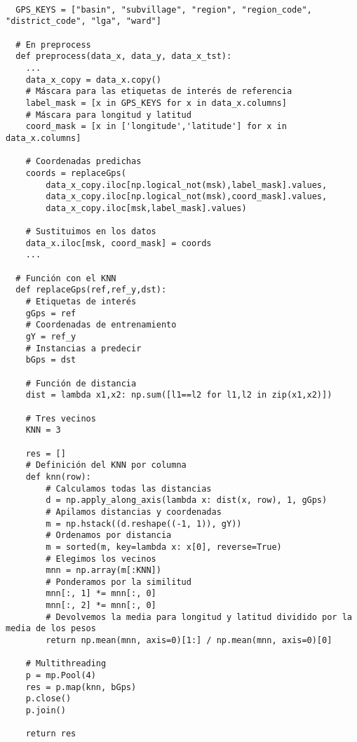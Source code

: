 \documentclass{article}
\begin{document}
\begin{verbatim}
               
  GPS_KEYS = ["basin", "subvillage", "region", "region_code", "district_code", "lga", "ward"]
  
  # En preprocess  
  def preprocess(data_x, data_y, data_x_tst):
    ...
    data_x_copy = data_x.copy()
    # Máscara para las etiquetas de interés de referencia
    label_mask = [x in GPS_KEYS for x in data_x.columns]
    # Máscara para longitud y latitud
    coord_mask = [x in ['longitude','latitude'] for x in data_x.columns]
    
    # Coordenadas predichas
    coords = replaceGps(
        data_x_copy.iloc[np.logical_not(msk),label_mask].values,
        data_x_copy.iloc[np.logical_not(msk),coord_mask].values,
        data_x_copy.iloc[msk,label_mask].values)
    
    # Sustituimos en los datos
    data_x.iloc[msk, coord_mask] = coords
    ...
  
  # Función con el KNN
  def replaceGps(ref,ref_y,dst):
    # Etiquetas de interés
    gGps = ref
    # Coordenadas de entrenamiento
    gY = ref_y
    # Instancias a predecir
    bGps = dst
    
    # Función de distancia
    dist = lambda x1,x2: np.sum([l1==l2 for l1,l2 in zip(x1,x2)])
	
	# Tres vecinos
    KNN = 3
    
    res = []    
    # Definición del KNN por columna
    def knn(row):
        # Calculamos todas las distancias
        d = np.apply_along_axis(lambda x: dist(x, row), 1, gGps)
        # Apilamos distancias y coordenadas
        m = np.hstack((d.reshape((-1, 1)), gY))
        # Ordenamos por distancia
        m = sorted(m, key=lambda x: x[0], reverse=True)
        # Elegimos los vecinos
        mnn = np.array(m[:KNN])
        # Ponderamos por la similitud
        mnn[:, 1] *= mnn[:, 0]
        mnn[:, 2] *= mnn[:, 0]
        # Devolvemos la media para longitud y latitud dividido por la media de los pesos
        return np.mean(mnn, axis=0)[1:] / np.mean(mnn, axis=0)[0]
    
    # Multithreading
    p = mp.Pool(4)
    res = p.map(knn, bGps)
    p.close()
    p.join()
    
    return res
\end{verbatim}
\end{document}
